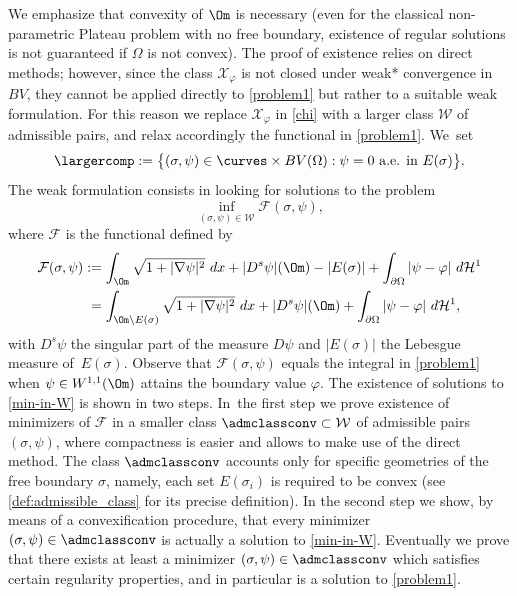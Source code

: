 We emphasize that convexity of $\Om$ is necessary (even for the classical non-parametric Plateau problem with no free boundary, existence of regular solutions is not guaranteed if $\Omega$ is not convex).
The proof of existence relies on direct methods; however, since the class $\mathcal X_\varphi$ is not closed under weak* convergence in $BV$, they cannot be applied directly to \eqref{problem1} but
rather to a suitable weak formulation. For this reason we replace $\mathcal X_\varphi$ in \eqref{chi} with a larger class $\mathcal W$ of admissible pairs, and relax accordingly the functional in \eqref{problem1}. We~set
\begin{equation}\label{def:admissible_class_bis}
\largercomp
:=\big\{(\sigma,\psi)\in \curves \times BV(\Omega): \psi=0\text{ a.e. in }E(\sigma)\big\}.
\end{equation}
The weak formulation consists in looking for solutions to the problem
\begin{equation}\label{min-in-W}
\inf_{(\sigma,\psi)\in\mathcal W}\mathcal F(\sigma,\psi),
\end{equation}
where $\mathcal F$ is the functional defined by
\begin{align}\label{def:relaxed_functional}
\mathcal F(\sigma,\psi)
&:=\int_\Om\sqrt{1+|\nabla\psi|^2}~dx+|D^s\psi|(\Om)-|E(\sigma)|+\int_{\partial\Omega}|\psi-\varphi|~d\mathcal H^1\nonumber\\
&\hphantom{:}=\int_{\Om\setminus E(\sigma)}\sqrt{1+|\nabla\psi|^2}~dx+|D^s\psi|(\Om)+\int_{\partial\Omega}|\psi-\varphi|~d\mathcal H^1,
\end{align}
with $D^s\psi$ the singular part of the measure
$D\psi$ and $|E(\sigma)|$ the Lebesgue measure of~$E(\sigma)$.
Observe that $\mathcal F(\sigma,\psi)$
equals the integral in \eqref{problem1} when $\psi\in W^{1,1}(\Om)$ attains the boundary value $\varphi$.
The existence of solutions to \eqref{min-in-W} is shown in two steps. In~the first step we prove existence of minimizers of $\mathcal F$ in a smaller
class $\admclassconv\subset\mathcal W$ of admissible pairs $(\sigma,\psi)$,
where compactness is easier and allows to make use of the direct method.
The class $\admclassconv$
accounts only for specific geometries of the free boundary $\sigma$,
namely, each set $E(\sigma_i)$ is required to be convex (see \eqref{def:admissible_class} for its precise definition).
In the second step we show,
by means of a convexification procedure, that every minimizer $(\sigma,\psi)\in\admclassconv$ is actually a solution to \eqref{min-in-W}.
Eventually we prove that there exists at least a minimizer $(\sigma,\psi)\in\admclassconv$ which satisfies certain regularity properties, and in particular is a solution to \eqref{problem1}.
